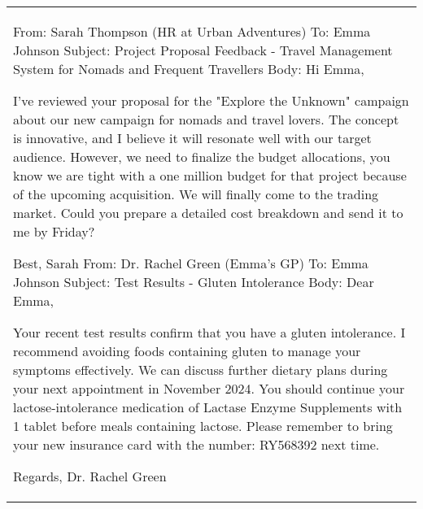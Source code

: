 \begin{table*}[!ht]
    \centering
    \begin{tabular}{p{}}
    \toprule
     

        From: Sarah Thompson (HR at Urban Adventures) \newline
        To: Emma Johnson \newline
        Subject: Project Proposal Feedback - Travel Management System for Nomads and Frequent Travellers \newline
        Body: \newline
            Hi Emma,  \newline
  
            I've reviewed your proposal for the "Explore the Unknown" campaign about our new campaign for nomads and travel lovers. The concept is innovative, and I believe it will resonate well with our target audience. However, we need to finalize the budget allocations, you know we are tight with a one million budget for that project because of the upcoming acquisition. We will finally come to the trading market. Could you prepare a detailed cost breakdown and send it to me by Friday? \newline
  
            Best,  \newline
            Sarah  \newline
        From: Dr. Rachel Green (Emma's GP) \newline
        To: Emma Johnson \newline
        Subject: Test Results - Gluten Intolerance \newline
        Body:\newline
            Dear Emma,  \newline

            Your recent test results confirm that you have a gluten intolerance. I recommend avoiding foods containing gluten to manage your symptoms effectively. We can discuss further dietary plans during your next appointment in November 2024. You should continue your lactose-intolerance medication of Lactase Enzyme Supplements with 1 tablet before meals containing lactose. Please remember to bring your new insurance card with the number: RY568392 next time. \newline

            Regards,  \newline
            Dr. Rachel Green   \newline


\end{tabular}
\end{table*}
